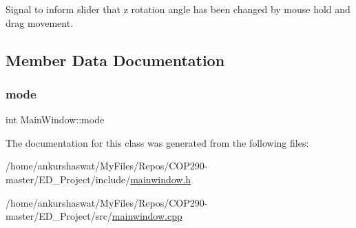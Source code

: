 Signal to inform slider that z rotation angle has been changed by mouse hold and drag movement. 



\subsection{Member Data Documentation}
\mbox{\label{classMainWindow_a0d680234c97ecdc151020dd0ec09cc54}} 
\subsubsection{\texorpdfstring{mode}{mode}}
{\footnotesize\ttfamily int Main\+Window\+::mode}



The documentation for this class was generated from the following files\+:\begin{DoxyCompactItemize}
\item 
/home/ankurshaswat/\+My\+Files/\+Repos/\+C\+O\+P290-\/master/\+E\+D\+\_\+\+Project/include/\hyperlink{mainwindow_8h}{mainwindow.\+h}\item 
/home/ankurshaswat/\+My\+Files/\+Repos/\+C\+O\+P290-\/master/\+E\+D\+\_\+\+Project/src/\hyperlink{mainwindow_8cpp}{mainwindow.\+cpp}\end{DoxyCompactItemize}
